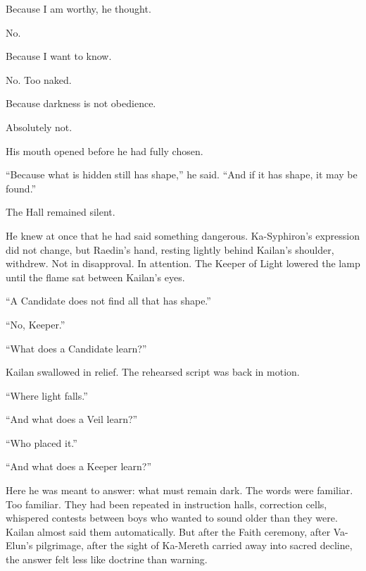 Because I am worthy, he thought.\par

No.\par

Because I want to know.\par

No. Too naked.\par

Because darkness is not obedience.\par

Absolutely not.\par

His mouth opened before he had fully chosen.\par

“Because what is hidden still has shape,” he said. “And if it has shape, it may be found.”\par

The Hall remained silent.\par

He knew at once that he had said something dangerous. Ka-Syphiron’s expression did not change, but Raedin’s hand, resting lightly behind Kailan’s shoulder, withdrew. Not in disapproval. In attention. The Keeper of Light lowered the lamp until the flame sat between Kailan’s eyes.\par

“A Candidate does not find all that has shape.”\par

“No, Keeper.”\par

“What does a Candidate learn?”\par

Kailan swallowed in relief. The rehearsed script was back in motion.\par

“Where light falls.”\par

“And what does a Veil learn?”\par

“Who placed it.”\par

“And what does a Keeper learn?”\par

Here he was meant to answer: what must remain dark. The words were familiar. Too familiar. They had been repeated in instruction halls, correction cells, whispered contests between boys who wanted to sound older than they were. Kailan almost said them automatically. But after the Faith ceremony, after Va-Elun’s pilgrimage, after the sight of Ka-Mereth carried away into sacred decline, the answer felt less like doctrine than warning.\par

